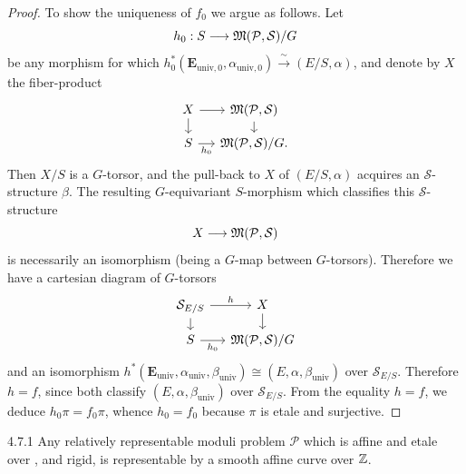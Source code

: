 \begin{proof}
To show the uniqueness of $f_0$ we argue as follows. Let
\[
h_0 : S \longrightarrow \mathfrak{M}(\mathcal{P}, \mathcal{S})/G
\]
be any morphism for which $h_0^*(\mathbf{E}_{\mathrm{univ},0}, \alpha_{\mathrm{univ},0}) \xrightarrow{\ \sim\ } (E/S, \alpha)$, and denote by $X$ the fiber-product
\[
\begin{tikzcd}[column sep=small, row sep=small]
X \arrow[r] \arrow[d] & \Mfrak(\mathcal{P}, \mathcal{S}) \arrow[d] \\
S \arrow[r, "h_0"'] & \Mfrak(\mathcal{P}, \mathcal{S})/G.
\end{tikzcd}
\]
Then $X/S$ is a $G$-torsor, and the pull-back to $X$ of $(E/S, \alpha)$ acquires an $\mathcal{S}$-structure $\beta$. The resulting $G$-equivariant $S$-morphism which classifies this $\mathcal{S}$-structure
\[
X \longrightarrow \mathfrak{M}(\mathcal{P}, \mathcal{S})
\]
is necessarily an isomorphism (being a $G$-map between $G$-torsors). Therefore we have a cartesian diagram of $G$-torsors
\[
\begin{tikzcd}[column sep=small, row sep=small]
\mathcal{S}_{E/S} \arrow[r, "h"] \arrow[d] & X \arrow[d] \\
S \arrow[r, "h_0"'] & \Mfrak(\mathcal{P}, \mathcal{S})/G
\end{tikzcd}
\]
and an isomorphism $h^*(\mathbf{E}_{\mathrm{univ}}, \alpha_{\mathrm{univ}}, \beta_{\mathrm{univ}}) \cong (E, \alpha, \beta_{\mathrm{univ}})$ over $\mathcal{S}_{E/S}$. Therefore $h = f$, since both classify $(E, \alpha, \beta_{\mathrm{univ}})$ over $\mathcal{S}_{E/S}$. From the equality $h = f$, we deduce $h_0\pi = f_0\pi$, whence $h_0 = f_0$ because $\pi$ is etale and surjective.
\end{proof}

\begin{customcor}{4.7.1}\label{cor:4.7.1}
Any relatively representable moduli problem $\mathcal{P}$ which is affine and etale over \Ell, and rigid, is representable by a smooth affine curve over $\mathbb{Z}$.
\end{customcor}

